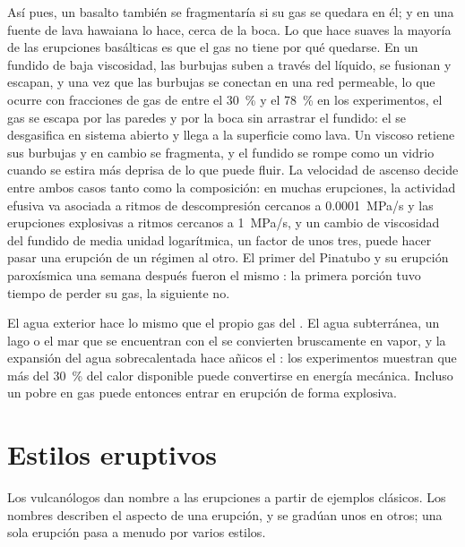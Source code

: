Así pues, un basalto también se fragmentaría si su gas se quedara en él; y en una fuente de lava
hawaiana lo hace, cerca de la boca. Lo que hace suaves la mayoría de las erupciones basálticas es que
el gas no tiene por qué quedarse. En un fundido de baja viscosidad, las burbujas suben a través del
líquido, se fusionan y escapan, y una vez que las burbujas se conectan en una red permeable,
lo que ocurre con fracciones de gas de entre el \qty{30}{\percent} y el \qty{78}{\percent}
en los experimentos, el gas se escapa por las paredes y por la boca sin arrastrar el
fundido: el  se desgasifica en sistema abierto y llega a la superficie como
lava. Un  viscoso retiene sus burbujas y en cambio se fragmenta, y el fundido se rompe
como un vidrio cuando se estira más deprisa de lo que puede fluir. La velocidad de ascenso decide
entre ambos casos tanto como la composición: en muchas erupciones, la actividad efusiva
va asociada a ritmos de descompresión cercanos a \qty{0.0001}{MPa/s} y las erupciones explosivas
a ritmos cercanos a \qty{1}{MPa/s}, y un cambio de viscosidad del fundido de media
unidad logarítmica, un factor de unos tres, puede hacer pasar una erupción de un régimen al
otro. El primer  del Pinatubo y su erupción paroxísmica una semana después
fueron el mismo : la primera porción tuvo tiempo de perder su gas, la siguiente no.

El agua exterior hace lo mismo que el propio gas del . El agua subterránea, un lago o el
mar que se encuentran con el  se convierten bruscamente en vapor, y la expansión del agua
sobrecalentada hace añicos el : los experimentos muestran que más del \qty{30}{\percent} del
calor disponible puede convertirse en energía mecánica. Incluso un  pobre en gas
puede entonces entrar en erupción de forma explosiva.

\section{Estilos eruptivos}

Los vulcanólogos dan nombre a las erupciones a partir de ejemplos clásicos. Los nombres describen el aspecto de una
erupción, y se gradúan unos en otros; una sola erupción pasa a menudo
por varios estilos.

